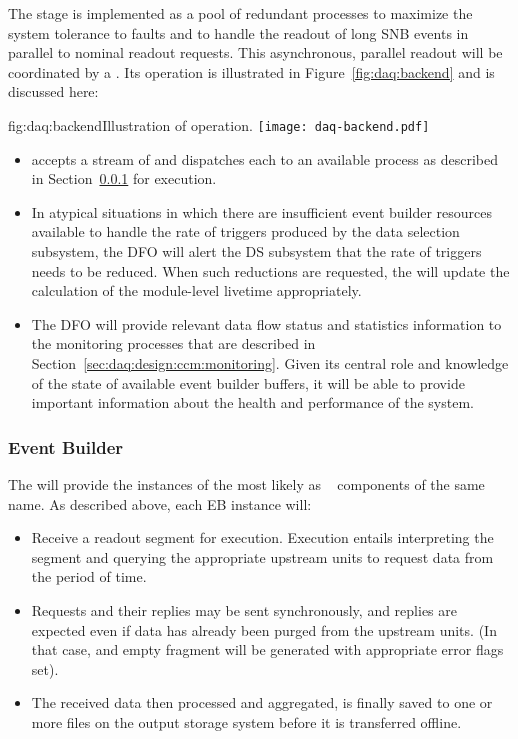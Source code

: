 The  stage is implemented as a pool of redundant  processes to maximize the system tolerance to faults and to handle the readout of long SNB events in parallel to nominal readout requests. This asynchronous, parallel readout will be coordinated by a .  Its operation is illustrated in Figure~\ref{fig:daq:backend} and is discussed here:


\begin{dunefigure}{fig:daq:backend}{Illustration of   operation.}
  \texttt{[image: daq-backend.pdf]}
\end{dunefigure}

\begin{itemize}
\item {} accepts a stream of  and dispatches each to an available  process as described in Section~\ref{sec:fd-daq:design-event-builder} for execution.
\item In atypical situations in which there are insufficient event builder resources available to handle the rate of triggers produced by the data selection subsystem, the DFO will alert the DS subsystem that the rate of triggers needs to be reduced.  When such reductions are requested, the  will update the calculation of the module-level  livetime appropriately.
\item The DFO will provide relevant data flow status and statistics information to the monitoring processes that are described in Section~\ref{sec:daq:design:ccm:monitoring}. Given its central role and knowledge of the state of available event builder buffers, it will be able to provide important information about the health and performance of the system.
\end{itemize}

\subsubsection{Event Builder}
\label{sec:fd-daq:design-event-builder}

The  will provide the instances of the  most likely as
~\cite{artdaq} components of the same name. 
As described above, each EB instance will:

\begin{itemize}
  \item Receive a readout segment for execution. Execution entails interpreting the  segment and querying the appropriate upstream  units to request data from the period of time. 
  \item Requests and their replies may be sent synchronously, and replies are expected even if data has already been purged from the upstream  units. (In that case, and empty fragment will be generated with appropriate error flags set).
  \item The received data then processed and aggregated, is finally saved to one or more files on the output storage system before it is transferred offline.
\end{itemize}

